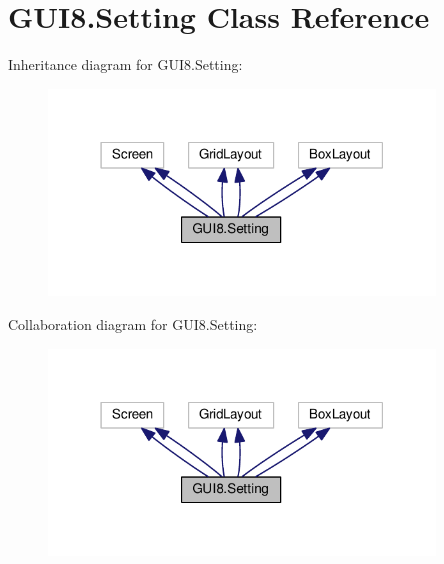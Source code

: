 \hypertarget{classGUI8_1_1Setting}{}\section{G\+U\+I8.\+Setting Class Reference}
\label{classGUI8_1_1Setting}


Inheritance diagram for G\+U\+I8.\+Setting\+:\nopagebreak
\begin{figure}[H]
\begin{center}
\leavevmode
\includegraphics[width=291pt]{classGUI8_1_1Setting__inherit__graph}
\end{center}
\end{figure}


Collaboration diagram for G\+U\+I8.\+Setting\+:\nopagebreak
\begin{figure}[H]
\begin{center}
\leavevmode
\includegraphics[width=291pt]{classGUI8_1_1Setting__coll__graph}
\end{center}
\end{figure}
